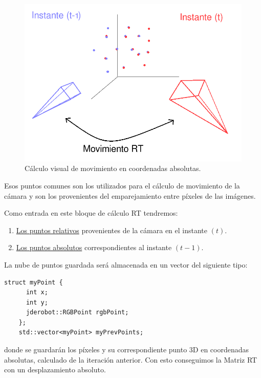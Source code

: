 \begin{figure}[th]
\centering
\includegraphics[scale=0.4]{Figures/movement-rt.png}
\decoRule
\caption[Cálculo visual de movimiento en coordenadas absolutas]{Cálculo visual de movimiento en coordenadas absolutas.}
\label{fig:movementRt}
\end{figure}

Esos puntos comunes son los utilizados para el cálculo de movimiento de la cámara y son los provenientes del emparejamiento entre píxeles de las imágenes.

Como entrada en este bloque de cálculo RT tendremos:

\begin{enumerate}
\item \underline{Los puntos relativos} provenientes de la cámara en el instante $(t)$.
\item \underline{Los puntos absolutos} correspondientes al instante $(t-1)$.
\end{enumerate}

La nube de puntos guardada será almacenada en un vector del siguiente tipo:

\begin{lstlisting}[style=CStyle]
    struct myPoint {
      int x;
      int y;
      jderobot::RGBPoint rgbPoint;
    };
    std::vector<myPoint> myPrevPoints;
\end{lstlisting}

donde se guardarán los píxeles y su correspondiente punto 3D en coordenadas absolutas, calculado de la iteración anterior. Con esto conseguimos la Matriz RT con un desplazamiento absoluto.

